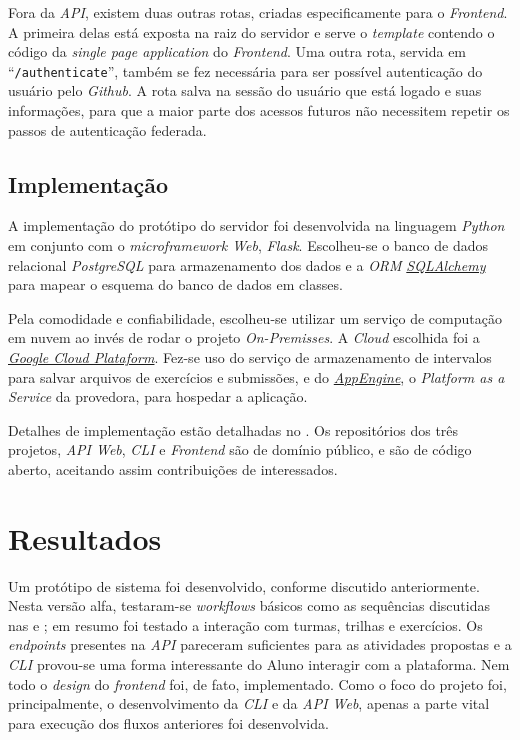 Fora da \emph{API}, existem duas outras rotas, criadas especificamente para o \emph{Frontend}.
A primeira delas está exposta na raiz do servidor e serve o \emph{template} contendo o código da  \emph{single page application} do \emph{Frontend}. Uma outra rota, servida em ``\texttt{/authenticate}'', também se fez necessária para ser possível autenticação do usuário pelo \emph{Github}. A rota salva na sessão do usuário que está logado e suas informações, para que a maior parte dos acessos futuros não necessitem repetir os passos de autenticação federada.

\subsection{Implementação} %
A implementação do protótipo do servidor foi desenvolvida na linguagem \emph{Python} em conjunto 
com o \emph{microframework Web}, \emph{Flask}. Escolheu-se o banco de dados relacional \emph{PostgreSQL} para armazenamento dos dados e a \emph{ORM} \hyperref[link:sqlalchemy]{\emph{SQLAlchemy}}  para mapear 
o esquema do banco de dados em classes. 

Pela comodidade e confiabilidade, escolheu-se utilizar um serviço de computação em nuvem ao invés de rodar o projeto \emph{On-Premisses}. A \emph{Cloud} escolhida foi a \hyperref[link:gcp]{\emph{Google Cloud Plataform}}. 
Fez-se uso do serviço de armazenamento de intervalos para salvar arquivos de exercícios e submissões,
e do \hyperref[link:appengine]{\emph{AppEngine}}, o  \emph{Platform as a Service} da provedora, para hospedar a aplicação.

Detalhes de implementação estão detalhadas no . Os repositórios dos três projetos, \emph{API Web},  \emph{CLI} e \emph{Frontend} são de domínio público, e são de código aberto, aceitando assim contribuições de interessados.

\section{Resultados}
Um protótipo de sistema foi desenvolvido, conforme discutido anteriormente. Nesta versão alfa, testaram-se \emph{workflows} básicos 
como as sequências discutidas nas  e ; em resumo foi testado a interação com turmas, trilhas e exercícios. Os \emph{endpoints} presentes na \emph{API} pareceram suficientes para as atividades  
propostas e a \emph{CLI} provou-se uma forma interessante do Aluno interagir com a plataforma. Nem todo o \emph{design} do \emph{frontend} foi, de fato, implementado. Como o foco do projeto foi, principalmente, o desenvolvimento da \emph{CLI} e da \emph{API Web},  apenas a parte vital para execução dos fluxos anteriores foi desenvolvida.

